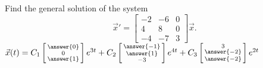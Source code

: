 \documentclass{ximera}
\begin{document}
\begin{exercise}%
    Find the general solution of the system
    \begin{equation*}
        {\vec{x}}' = 
        \begin{bmatrix} 
            -2 & -6 & 0 \\ 
            4 & 8 & 0 \\ 
            -4 & -7 & 3 
        \end{bmatrix} \vec{x}.
    \end{equation*}
    $\vec{x}(t) = C_1 \left[\begin{smallmatrix} \answer{0} \\ 0 \\ \answer{1} \end{smallmatrix}\right]e^{3t} + C_2 \left[\begin{smallmatrix} \answer{-1} \\ \answer{1} \\ -3 \end{smallmatrix}\right] e^{4t} + C_3 \left[\begin{smallmatrix} 3 \\ \answer{-2} \\ \answer{-2} \end{smallmatrix}\right] e^{2t}$
\end{exercise}
\end{document}
